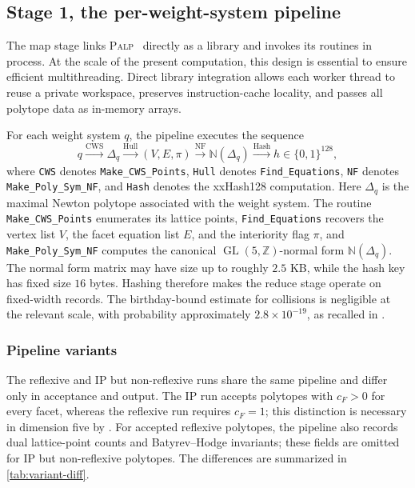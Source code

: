 \documentclass[appliedmath,article,submit,moreauthors]{Definitions/mdpi}
\newcommand{\Z}{\mathbb{Z}}
\newcommand{\GL}{\operatorname{GL}}
\newcommand{\NF}{\mathbb{N}}
\newcommand{\PALP}{\textsc{Palp}}
\newcommand{\Dq}{\Delta_q}
\begin{document}
\subsection{Stage 1, the per-weight-system pipeline}
\label{sec:pipe-stage1}

The map stage links \PALP~\cite{PALP} directly as a library and invokes its
routines in process. At the scale of the present computation, this design is
essential to ensure efficient multithreading. Direct library integration allows
each worker thread to reuse a private workspace, preserves instruction-cache
locality, and passes all polytope data as in-memory arrays.

For each weight system \(q\), the pipeline executes the sequence
\[
q
\xrightarrow{\text{CWS}}
\Dq
\xrightarrow{\text{Hull}}
(V,E,\pi)
\xrightarrow{\text{NF}}
\NF(\Dq)
\xrightarrow{\text{Hash}}
h\in\{0,1\}^{128},
\]
where \nolinkurl{CWS} denotes \nolinkurl{Make_CWS_Points}, \nolinkurl{Hull}
denotes \nolinkurl{Find_Equations}, \nolinkurl{NF} denotes
\nolinkurl{Make_Poly_Sym_NF}, and \nolinkurl{Hash} denotes the xxHash128
computation. Here \(\Dq\) is the maximal Newton polytope associated with the
weight system. The routine \nolinkurl{Make\_CWS\_Points} enumerates its lattice
points, \nolinkurl{Find\_Equations} recovers the vertex list \(V\), the facet
equation list \(E\), and the interiority flag \(\pi\), and
\nolinkurl{Make\_Poly\_Sym\_NF} computes the canonical \(\GL(5,\Z)\)-normal form
\(\NF(\Dq)\). The normal form matrix may have size up to roughly \(2.5\) KB,
while the hash key has fixed size \(16\) bytes. Hashing therefore makes the
reduce stage operate on fixed-width records. The birthday-bound estimate for
collisions is negligible at the relevant scale, with probability approximately
\(2.8\times10^{-19}\), as recalled in .

\subsubsection{Pipeline variants}

The reflexive and IP but non-reflexive runs share the same pipeline and differ
only in acceptance and output. The IP run accepts polytopes with \(c_F>0\) for
every facet, whereas the reflexive run requires \(c_F=1\); this distinction is
necessary in dimension five by . For accepted reflexive
polytopes, the pipeline also records dual lattice-point counts and
Batyrev--Hodge invariants; these fields are omitted for IP but non-reflexive
polytopes. The differences are summarized in \cref{tab:variant-diff}.
\end{document}

